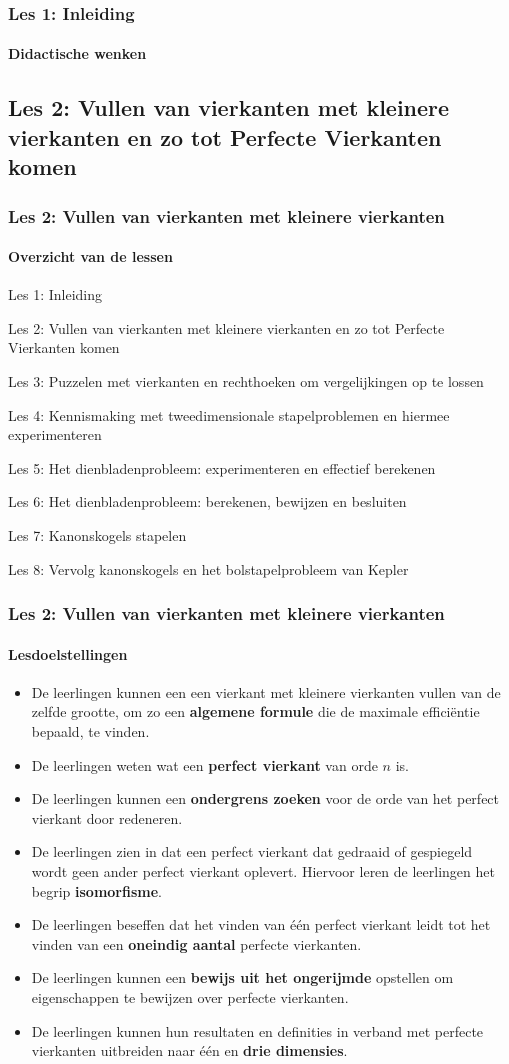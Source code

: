 \documentclass[dutch]{beamer}
\begin{document}
\begin{frame}
\frametitle{Les 1: Inleiding}
\framesubtitle{Didactische wenken}

\end{frame}

\subsection{Les 2: Vullen van vierkanten met kleinere vierkanten en zo tot Perfecte Vierkanten komen}
\begin{frame}
\frametitle{Les 2: Vullen van vierkanten met kleinere vierkanten}
\framesubtitle{Overzicht van de lessen}
\begin{list}{\quad}{}
\item Les 1: Inleiding
\item {\color{blue}Les 2: Vullen van vierkanten met kleinere vierkanten en zo tot Perfecte Vierkanten komen}
\item Les 3: Puzzelen met vierkanten en rechthoeken om vergelijkingen op te lossen
\item Les 4: Kennismaking met tweedimensionale stapelproblemen en hiermee experimenteren
\item Les 5: Het dienbladenprobleem: experimenteren en effectief berekenen
\item Les 6: Het dienbladenprobleem: berekenen, bewijzen en besluiten
\item Les 7: Kanonskogels stapelen
\item Les 8: Vervolg kanonskogels en het bolstapelprobleem van Kepler
\end{list}
\end{frame}

\begin{frame}
\frametitle{Les 2: Vullen van vierkanten met kleinere vierkanten}
\framesubtitle{Lesdoelstellingen}
\small
\begin{itemize}
\item De leerlingen kunnen een een vierkant met kleinere vierkanten vullen van de zelfde grootte, om zo een {\bf algemene formule} die de maximale effici\"{e}ntie bepaald, te vinden.
\item De leerlingen weten wat een {\bf perfect vierkant} van orde $n$ is.
\item De leerlingen kunnen een {\bf ondergrens zoeken} voor de orde van het perfect vierkant door redeneren.
\item De leerlingen zien in dat een perfect vierkant dat gedraaid of gespiegeld wordt geen ander perfect vierkant oplevert. Hiervoor leren de leerlingen het begrip {\bf isomorfisme}.
\item De leerlingen beseffen dat het vinden van \'{e}\'{e}n perfect vierkant leidt tot het vinden van een {\bf oneindig aantal} perfecte vierkanten. 
\item De leerlingen kunnen een {\bf bewijs uit het ongerijmde} opstellen om eigenschappen te bewijzen over perfecte vierkanten.
\item De leerlingen kunnen hun resultaten en definities in verband met perfecte vierkanten uitbreiden naar \'{e}\'{e}n en {\bf drie dimensies}.
\end{itemize}
\end{frame}
\end{document}
